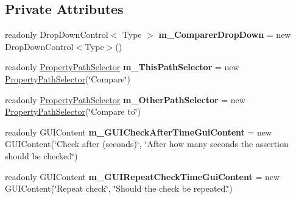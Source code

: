 \subsection*{Private Attributes}
\begin{DoxyCompactItemize}
\item 
\mbox{\label{class_unity_test_1_1_assertion_component_editor_a628eecd13a3e9ef028591f20015f32be}} 
readonly Drop\+Down\+Control$<$ Type $>$ {\bfseries m\+\_\+\+Comparer\+Drop\+Down} = new Drop\+Down\+Control$<$Type$>$()
\item 
\mbox{\label{class_unity_test_1_1_assertion_component_editor_a3b69720310ec08eb4ca8faa1ac546108}} 
readonly \hyperlink{class_unity_test_1_1_property_path_selector}{Property\+Path\+Selector} {\bfseries m\+\_\+\+This\+Path\+Selector} = new \hyperlink{class_unity_test_1_1_property_path_selector}{Property\+Path\+Selector}(\char`\"{}Compare\char`\"{})
\item 
\mbox{\label{class_unity_test_1_1_assertion_component_editor_a0cdbe3d0ac0f2a7d3120664e4b102223}} 
readonly \hyperlink{class_unity_test_1_1_property_path_selector}{Property\+Path\+Selector} {\bfseries m\+\_\+\+Other\+Path\+Selector} = new \hyperlink{class_unity_test_1_1_property_path_selector}{Property\+Path\+Selector}(\char`\"{}Compare to\char`\"{})
\item 
\mbox{\label{class_unity_test_1_1_assertion_component_editor_a7fbb3ec16388dfbf7246ee79859967dd}} 
readonly G\+U\+I\+Content {\bfseries m\+\_\+\+G\+U\+I\+Check\+After\+Time\+Gui\+Content} = new G\+U\+I\+Content(\char`\"{}Check after (seconds)\char`\"{}, \char`\"{}After how many seconds the assertion should be checked\char`\"{})
\item 
\mbox{\label{class_unity_test_1_1_assertion_component_editor_a8e185516fdc26536b8e14d9e6fde6bcb}} 
readonly G\+U\+I\+Content {\bfseries m\+\_\+\+G\+U\+I\+Repeat\+Check\+Time\+Gui\+Content} = new G\+U\+I\+Content(\char`\"{}Repeat check\char`\"{}, \char`\"{}Should the check be repeated.\char`\"{})
\item 
\mbox{\label{class_unity_test_1_1_assertion_component_editor_a34bba9156baf4aee0e616c060e466af5}} 

\end{DoxyCompactItemize}
